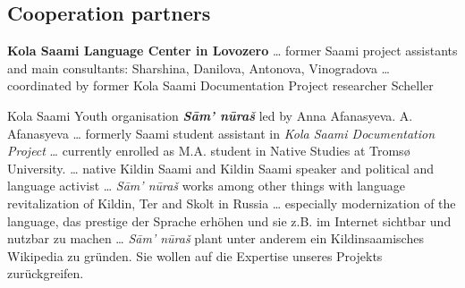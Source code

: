 \documentclass[a4paper,12pt]{article}
\begin{document}
\subsection{Cooperation partners}

{\bf Kola Saami Language Center in Lovozero} … former Saami project assistants and main consultants: Sharshina, Danilova, Antonova, Vinogradova … coordinated by former Kola Saami Documentation Project researcher Scheller

Kola Saami Youth organisation \textit{\textbf{Sām' nūraš}}  led by Anna Afanasyeva. A.\,Afanasyeva … formerly Saami student assistant in {\it Kola Saami Documentation Project} … currently enrolled as M.A. student in Native Studies at Tromsø University. … native Kildin Saami and Kildin Saami speaker and political and language activist … {\it Sām' nūraš} works among other things with language revitalization of Kildin, Ter and Skolt in Russia … especially modernization of the language, das prestige der Sprache erhöhen und sie z.B. im Internet sichtbar und nutzbar zu machen … {\it Sām' nūraš} plant unter anderem ein Kildinsaamisches Wikipedia  zu gründen. Sie wollen auf die Expertise unseres Projekts zurückgreifen.
\end{document}
